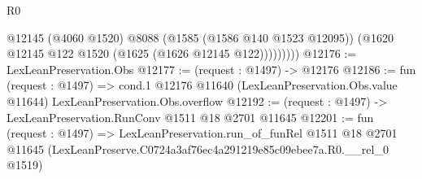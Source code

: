 \begin{lexlean}{R0}
\begin{coremodule}
                @12145
                (@4060 @1520)
                @8088
                (@1585 (@1586 @140 @1523 @12095))
                (@1620 @12145 @122 @1520 (@1625 (@1626 @12145 @122)))))))))
@12176 := LexLeanPreservation.Obs
@12177 := (request : @1497) -> @12176
@12186 := fun (request : @1497) =>
  cond.{1} @12176 @11640 (LexLeanPreservation.Obs.value @11644) LexLeanPreservation.Obs.overflow
@12192 := (request : @1497) -> LexLeanPreservation.RunConv @1511 @18 @2701 @11645
@12201 := fun (request : @1497) =>
  LexLeanPreservation.run_of_funRel
    @1511
    @18
    @2701
    @11645
    (LexLeanPreserve.C0724a3af76ec4a291219e85c09ebee7a.R0.__rel_0 @1519)
\end{coremodule}
\end{lexlean}
